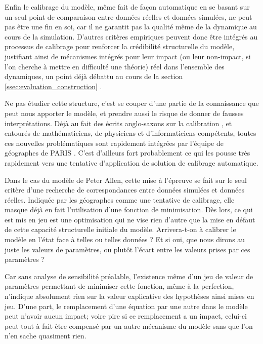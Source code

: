 Enfin le calibrage du modèle, même fait de façon automatique en se basant sur un seul point de comparaison entre données réelles et données simulées, ne peut pas être une fin en soi, car il ne garantit pas la qualité même de la dynamique au cours de la simulation. D'autres critères empiriques peuvent donc être intégrés au processus de calibrage pour renforcer la crédibilité structurelle du modèle, justifiant ainsi de mécanismes intégrés pour leur impact (ou leur non-impact, si l'on cherche à mettre en difficulté une théorie) réel dans l'ensemble des dynamiques, un point déjà débattu au cours de la section \ref{ssec:evaluation_construction} \autocites{Hermann1967, Grimm2005,Cottineau2014b}.

Ne pas étudier cette structure, c'est se couper d'une partie de la connaissance que peut nous apporter le modèle, et prendre aussi le risque de donner de fausses interprétations. Déjà au fait des écrits anglo-saxons sur la calibration \autocite{Batty1976}, et entourés de mathématiciens, de physiciens et d'informaticiens compétents, toutes ces nouvelles problématiques sont rapidement intégrées par l'équipe de géographes de PARIS \autocites{Sanders1984, Sanders1985, Pumain1989}. C'est d'ailleurs fort probablement ce qui les pousse très rapidement vers une tentative d'application de solution de calibrage automatique.

Dans le cas du modèle de Peter Allen, cette mise à l'épreuve se fait sur le seul critère d'une recherche de correspondances entre données simulées et données réelles. Indiquée par les géographes comme une tentative de calibrage, elle masque déjà en fait l'utilisation d'une fonction de minimisation. Dès lors, ce qui est mis en jeu est une optimisation qui ne vise rien d'autre que la mise en défaut de cette capacité structurelle initiale du modèle. Arrivera-t-on à calibrer le modèle en l'état face à telles ou telles données ? Et si oui, que nous dirons au juste les valeurs de paramètres, ou plutôt l'écart entre les valeurs prises par ces paramètres ?

Car sans analyse de sensibilité préalable, l'existence même d'un jeu de valeur de paramètres permettant de minimiser cette fonction, même à la perfection, n'indique absolument rien sur la valeur explicative des hypothèses ainsi mises en jeu. D'une part, le remplacement d'une équation par une autre dans le modèle peut n'avoir aucun impact; voire pire si ce remplacement a un impact, celui-ci peut tout à fait être compensé par un autre mécanisme du modèle sans que l'on n'en sache quasiment rien.

